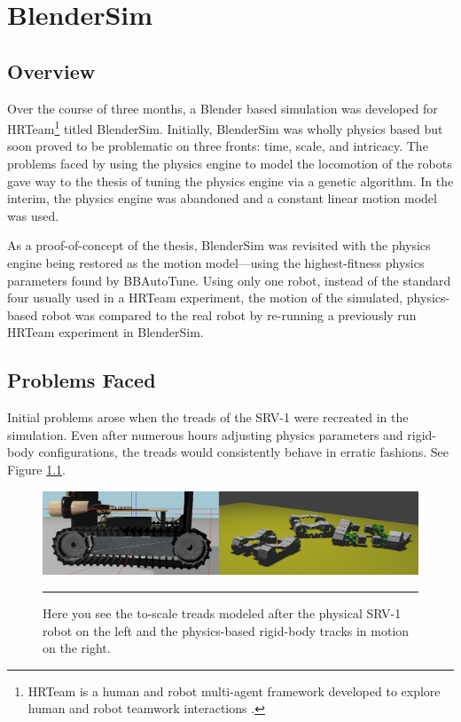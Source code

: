 \chapter{BlenderSim}

\label{Chapter5}

\section{Overview}


Over the course of three months, a Blender based simulation was developed for HRTeam\footnote{HRTeam is a human and robot multi-agent framework developed to explore human and robot teamwork interactions \cite{hrteam}.} titled BlenderSim. Initially, BlenderSim was wholly physics based but soon proved to be problematic on three fronts: time, scale, and intricacy. The problems faced by using the physics engine to model the locomotion of the robots gave way to the thesis of tuning the physics engine via a genetic algorithm. In the interim, the physics engine was abandoned and a constant linear motion model was used. 

As a proof-of-concept of the thesis, BlenderSim was revisited with the physics engine being restored as the motion model---using the highest-fitness physics parameters found by BBAutoTune. Using only one robot, instead of the standard four usually used in a HRTeam experiment, the motion of the simulated, physics-based robot was compared to the real robot by re-running a previously run HRTeam experiment in BlenderSim.      



\section{Problems Faced}

Initial problems arose when the treads of the SRV-1 were recreated in the simulation. Even after numerous hours adjusting physics parameters and rigid-body configurations, the treads would consistently behave in erratic fashions. See Figure \ref{treads}.

\begin{figure}[htbp]
\centering
\includegraphics[scale=0.25]{../Figures/Chapter5/treads.png}
\rule{35em}{0.5pt}
\caption[Simulated Treads]{Here you see the to-scale treads modeled after the physical SRV-1 robot on the left and the physics-based rigid-body tracks in motion on the right.}
\label{treads}
\end{figure}

